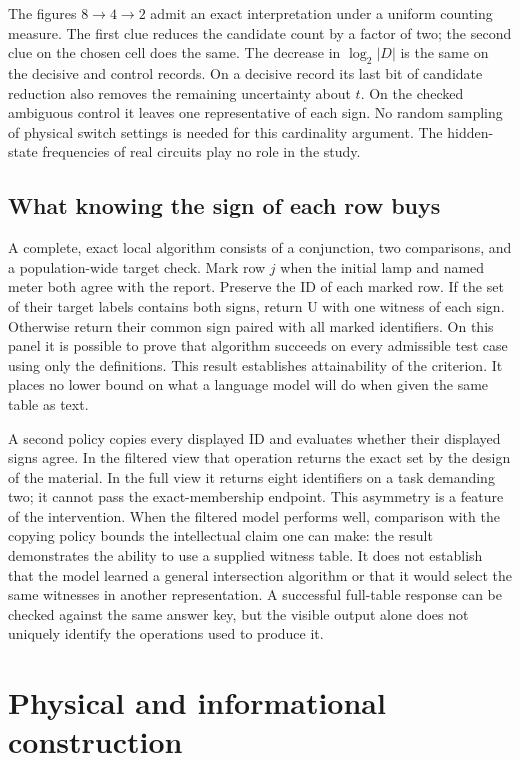 \documentclass[12pt,letterpaper]{article}
\begin{document}
The figures $8\to4\to2$ admit an exact interpretation under a uniform counting measure. The first clue reduces the candidate count by a factor of two; the second clue on the chosen cell does the same. The decrease in $\log_2|D|$ is the same on the decisive and control records. On a decisive record its last bit of candidate reduction also removes the remaining uncertainty about $t$. On the checked ambiguous control it leaves one representative of each sign. No random sampling of physical switch settings is needed for this cardinality argument. The hidden-state frequencies of real circuits play no role in the study.

\subsection{What knowing the sign of each row buys}

A complete, exact local algorithm consists of a conjunction, two comparisons, and a population-wide target check. Mark row $j$ when the initial lamp and named meter both agree with the report. Preserve the ID of each marked row. If the set of their target labels contains both signs, return U with one witness of each sign. Otherwise return their common sign paired with all marked identifiers. On this panel it is possible to prove that algorithm succeeds on every admissible test case using only the definitions. This result establishes attainability of the criterion. It places no lower bound on what a language model will do when given the same table as text.

A second policy copies every displayed ID and evaluates whether their displayed signs agree. In the filtered view that operation returns the exact set by the design of the material. In the full view it returns eight identifiers on a task demanding two; it cannot pass the exact-membership endpoint. This asymmetry is a feature of the intervention. When the filtered model performs well, comparison with the copying policy bounds the intellectual claim one can make: the result demonstrates the ability to use a supplied witness table. It does not establish that the model learned a general intersection algorithm or that it would select the same witnesses in another representation. A successful full-table response can be checked against the same answer key, but the visible output alone does not uniquely identify the operations used to produce it.



\section{Physical and informational construction}
\end{document}

